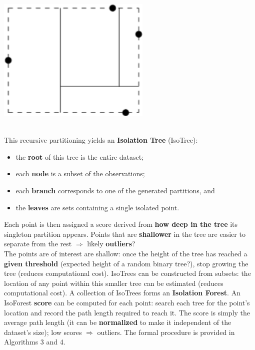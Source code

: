 \documentclass[20pt,landscape,footrule,headrule]{foils}
\newcommand{\newl}{\newline\newline}
\begin{document}
{{\begin{center}\includegraphics[width=0.55\textwidth]{Images/Figure14}
\end{center}
\newpage\ \\ \noindent 
This recursive partitioning yields an \textbf{Isolation Tree} (IsoTree):
\begin{itemize}
\item the \textbf{root} of this tree is the entire dataset; 
\item each \textbf{node} is a subset of the observations; \item each \textbf{branch} corresponds to one of the generated partitions, and 
\item the \textbf{leaves} are sets containing a single isolated point. \end{itemize} Each point is then assigned a score derived from \textbf{how deep in the tree} its singleton partition appears. \newl Points that are \textbf{shallower} in the tree are easier to separate from the rest $\Longrightarrow$  likely \textbf{outliers}? 
\newpage\ \\ \noindent The  points are of interest are shallow: once the height of the tree has reached a \textbf{given threshold} (expected height of a random binary tree?), stop growing the tree (reduces computational cost). \newl
IsoTrees can be constructed from subsets: the location of any point within this smaller tree can be estimated (reduces computational cost). 
\newl A collection of IsoTrees forms an \textbf{Isolation Forest}. \newl An IsoForest \textbf{score} can be computed for each point: search each tree for the point's location and record the path length required to reach it. The score is simply the average path length (it can be \textbf{normalized} to make it  independent of the dataset's size); low scores $\Longrightarrow$ outliers. \newl The formal procedure is provided in Algorithms 3 and 4.  \newpage\ \\
\begin{center}

\end{center}}}
\end{document}
